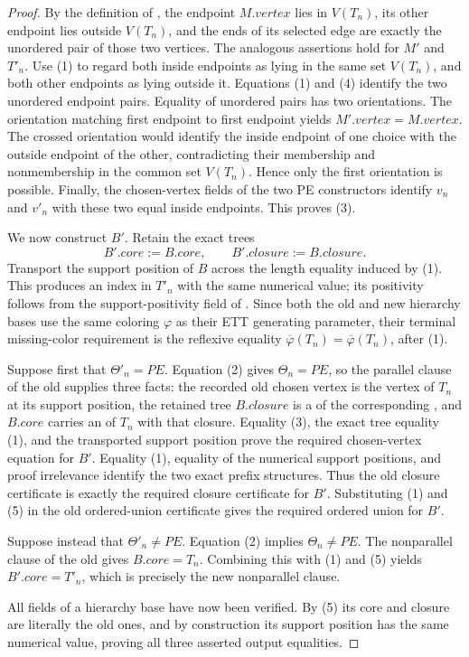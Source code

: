 \begin{proof}
By the definition of , the endpoint
\(M.\mathit{vertex}\) lies in \(V(T_n)\), its other endpoint lies outside
\(V(T_n)\), and the ends of its selected edge are exactly the unordered
pair of those two vertices.  The analogous assertions hold for \(M'\) and
\(T'_n\).  Use (1) to regard both inside endpoints as lying in the same
set \(V(T_n)\), and both other endpoints as lying outside it.  Equations
(1) and (4) identify the two unordered endpoint pairs.  Equality of
unordered pairs has two orientations.  The orientation matching first
endpoint to first endpoint yields
\(M'.\mathit{vertex}=M.\mathit{vertex}\).  The crossed orientation would
identify the inside endpoint of one choice with the outside endpoint of
the other, contradicting their membership and nonmembership in the common
set \(V(T_n)\).  Hence only the first orientation is possible.  Finally,
the chosen-vertex fields of the two PE constructors identify \(v_n\) and
\(v'_n\) with these two equal inside endpoints.  This proves (3).

We now construct \(B'\).  Retain the exact trees
\[
 B'.\mathit{core}:=B.\mathit{core},\qquad
 B'.\mathit{closure}:=B.\mathit{closure}.                       \tag{5}
\]
Transport the support position of \(B\) across the length equality induced
by (1).  This produces an index in \(T'_n\) with the same numerical value;
its positivity follows from the support-positivity field of
.  Since both the old and new hierarchy bases use
the same coloring \(\varphi\) as their ETT generating parameter, their
terminal missing-color requirement is the reflexive equality
\(\overline\varphi(T_n)=\overline\varphi(T_n)\), after (1).

Suppose first that \(\Theta'_n=PE\).  Equation (2) gives
\(\Theta_n=PE\), so the parallel clause of the old
 supplies three facts: the recorded old chosen
vertex is the vertex of \(T_n\) at its support position, the retained tree
\(B.\mathit{closure}\) is a
 of the corresponding
, and \(B.\mathit{core}\) carries an
 of \(T_n\) with that closure.  Equality (3),
the exact tree equality (1), and the transported support position prove
the required chosen-vertex equation for \(B'\).  Equality (1), equality
of the numerical support positions, and proof irrelevance identify the
two exact prefix structures.  Thus the old closure certificate is exactly
the required closure certificate for \(B'\).  Substituting (1) and (5) in
the old ordered-union certificate gives the required ordered union for
\(B'\).

Suppose instead that \(\Theta'_n\ne PE\).  Equation (2) implies
\(\Theta_n\ne PE\).  The nonparallel clause of the old
 gives \(B.\mathit{core}=T_n\).  Combining this
with (1) and (5) yields \(B'.\mathit{core}=T'_n\), which is precisely the
new nonparallel clause.

All fields of a hierarchy base have now been verified.  By (5) its core
and closure are literally the old ones, and by construction its support
position has the same numerical value, proving all three asserted output
equalities.
\end{proof}
